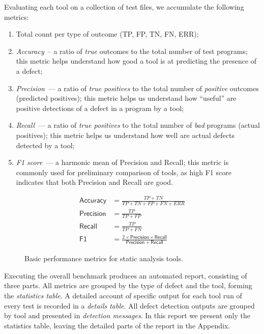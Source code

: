 Evaluating each tool on a collection of test files, we accumulate the following metrics:
\begin{enumerate}
    \item Total count per type of outcome (TP, FP, TN, FN, ERR);
    \item \emph{Accuracy}~-- a ratio of \emph{true} outcomes to the total number of test programs; this metric helps understand how good a tool is at predicting the presence of a defect;
    \item \emph{Precision}~--- a ratio of \emph{true positives} to the total number of \emph{positive} outcomes (predicted positives); this metric helps us understand how ``useful'' are positive detections of a defect in a program by a tool;
    \item \emph{Recall}~--- a ratio of \emph{true positives} to the total number of \emph{bad} programs (actual positives); this metric helps us understand how well are actual defects detected by a tool;
    \item \emph{F1 score}~--- a harmonic mean of Precision and Recall; this metric is commonly used for preliminary comparison of tools, as high F1 score indicates that both Precision and Recall are good.
\end{enumerate}

\begin{figure}[ht]
    \centering
    \begin{mdframed}
    \begin{align}
        \mathsf{Accuracy} &=\frac{TP + TN} {TP + TN + FP + FN + ERR} \\
        \mathsf{Precision} &= \frac{TP} {TP + FP} \\
        \mathsf{Recall} &= \frac{TP} {TP + FN} \\
        \mathsf{F1} &= \frac{2 \times \mathsf{Precision} \times \mathsf{Recall}} {\mathsf{Precision} + \mathsf{Recall}}
    \end{align}
    \end{mdframed}
    \caption{Basic performance metrics for static analysis tools.}
    \label{fig:metrics}
\end{figure}

Executing the overall benchmark produces an automated report, consisting of three parts. All metrics are grouped by the type of defect and the tool, forming the \emph{statistics table}. A detailed account of specific output for each tool run of every test is recorded in a \emph{details table}. All defect detection outputs are grouped by tool and presented in \emph{detection messages}. In this report we present only the statistics table, leaving the detailed parts of the report in the Appendix.

